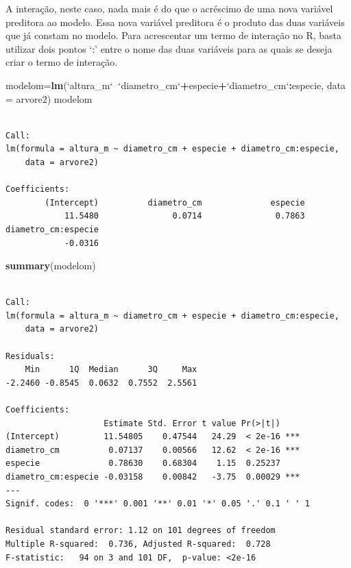 \documentclass[12pt,brazil,oneside]{book}
\newenvironment{Shaded}{\begin{snugshade}}{\end{snugshade}}
\newcommand{\DataTypeTok}[1]{\textcolor[rgb]{0.13,0.29,0.53}{#1}}
\newcommand{\KeywordTok}[1]{\textcolor[rgb]{0.13,0.29,0.53}{\textbf{#1}}}
\newcommand{\NormalTok}[1]{#1}
\newcommand{\OperatorTok}[1]{\textcolor[rgb]{0.81,0.36,0.00}{\textbf{#1}}}
\newcommand{\StringTok}[1]{\textcolor[rgb]{0.31,0.60,0.02}{#1}}
\begin{document}
A interação, neste caso, nada mais é do que o acréscimo de uma nova
variável preditora ao modelo. Essa nova variável preditora é o produto
das duas variáveis que já constam no modelo. Para acrescentar um termo
de interação no R, basta utilizar dois pontos `:' entre o nome das duas
variáveis para as quais se deseja criar o termo de interação.

\begin{Shaded}
\begin{Highlighting}[]
\NormalTok{modelom=}\KeywordTok{lm}\NormalTok{(}\StringTok{`}\DataTypeTok{altura_m}\StringTok{`}\OperatorTok{~}\StringTok{`}\DataTypeTok{diametro_cm}\StringTok{`}\OperatorTok{+}\NormalTok{especie}\OperatorTok{+}\StringTok{`}\DataTypeTok{diametro_cm}\StringTok{`}\OperatorTok{:}\NormalTok{especie, }\DataTypeTok{data =}\NormalTok{ arvore2)}
\NormalTok{modelom}
\end{Highlighting}
\end{Shaded}

\begin{verbatim}

Call:
lm(formula = altura_m ~ diametro_cm + especie + diametro_cm:especie, 
    data = arvore2)

Coefficients:
        (Intercept)          diametro_cm              especie  
            11.5480               0.0714               0.7863  
diametro_cm:especie  
            -0.0316  
\end{verbatim}

\begin{Shaded}
\begin{Highlighting}[]
\KeywordTok{summary}\NormalTok{(modelom)}
\end{Highlighting}
\end{Shaded}

\begin{verbatim}

Call:
lm(formula = altura_m ~ diametro_cm + especie + diametro_cm:especie, 
    data = arvore2)

Residuals:
    Min      1Q  Median      3Q     Max 
-2.2460 -0.8545  0.0632  0.7552  2.5561 

Coefficients:
                    Estimate Std. Error t value Pr(>|t|)    
(Intercept)         11.54805    0.47544   24.29  < 2e-16 ***
diametro_cm          0.07137    0.00566   12.62  < 2e-16 ***
especie              0.78630    0.68304    1.15  0.25237    
diametro_cm:especie -0.03158    0.00842   -3.75  0.00029 ***
---
Signif. codes:  0 '***' 0.001 '**' 0.01 '*' 0.05 '.' 0.1 ' ' 1

Residual standard error: 1.12 on 101 degrees of freedom
Multiple R-squared:  0.736, Adjusted R-squared:  0.728 
F-statistic:   94 on 3 and 101 DF,  p-value: <2e-16
\end{verbatim}
\end{document}
